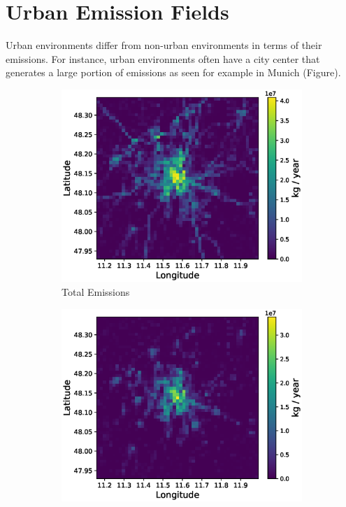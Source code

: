 \section{Urban Emission Fields}
Urban environments differ from non-urban environments in terms of their emissions.
For instance, urban environments often have a city center that generates a large portion of emissions as seen for example in Munich (Figure).
\begin{figure}
    \centering
    \begin{subfigure}{0.32\textwidth}
        \centering
        \includegraphics[width=\linewidth]{figures/03_dataset/munich/munich_2015_total_emissions.eps}
        \caption{Total Emissions}
    \end{subfigure}
    \begin{subfigure}{0.32\textwidth}
        \centering
        \includegraphics[width=\linewidth]{figures/03_dataset/munich/munich_2015_sector_c.eps}

\end{subfigure}
\end{figure}
